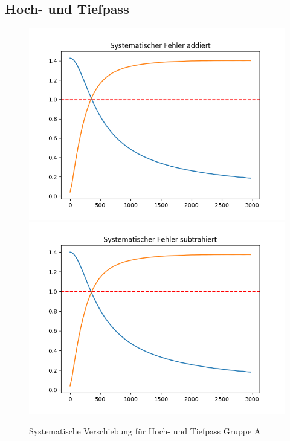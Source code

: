 \documentclass[12pt,a4paper]{article}
\begin{document}
\newpage
\subsection{Hoch- und Tiefpass}

\begin{figure}[H]
\centering
\includegraphics[scale=0.5]{Bilder/HochTief_oben_A.png}
\includegraphics[scale=0.5]{Bilder/HochTief_unten_A.png}
\caption{Systematische Verschiebung für Hoch- und Tiefpass Gruppe A}
\end{figure}
\end{document}
